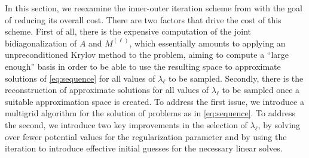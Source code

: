 In this section, we reexamine the inner-outer iteration scheme from
\cite{Gazzola_etal_2020} with the goal of reducing its overall cost.
There are two factors that drive the cost of this scheme.  First of
all, there is the expensive computation of the joint bidiagonalization
of $A$ and $M^{(\ell)}$, which essentially amounts to applying an
unpreconditioned Krylov method to the problem, aiming to compute a
``large enough'' basis in order to be able to use the resulting space
to approximate solutions of \eqref{eq:sequence} for all values of
$\lambda_\ell$ to be sampled.  Secondly, there is the reconstruction
of approximate solutions for all values of $\lambda_\ell$ to be
sampled once a suitable approximation space is created.  To address
the first issue, we introduce a multigrid algorithm for the solution
of problems as in \eqref{eq:sequence}.  To address the second, we
introduce two key improvements in the selection of $\lambda_\ell$, by
solving over fewer potential values for the regularization parameter
and by using the iteration to introduce effective initial guesses for
the necessary linear solves.


